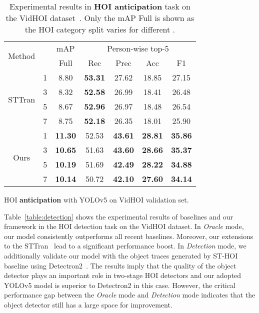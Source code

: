\documentclass[times,twocolumn,final,authoryear]{elsarticle}
\begin{document}
\begin{table}
    \begin{subtable}[]{0.47\textwidth}
        \centering
        \small
        \begin{tabular}{|c|c|c|c c c c|}
            \hline
            \multirow{2}{*}{Method} & \multirow{2}{*}{} & mAP & \multicolumn{4}{c|}{Person-wise top-5} \\
            \cline{3-7}
            & & Full & Rec & Prec & Acc & F1 \\
            \hline
            \multirow{4}{*}{STTran} & 1 & 8.80 & \textbf{53.31} & 27.62 & 18.85 & 27.15\\
            & 3 & 8.32 & \textbf{52.58} & 26.99 & 18.41 & 26.48\\
            & 5 & 8.67 & \textbf{52.96} & 26.97 & 18.48 & 26.54\\
            & 7 & 8.75 & \textbf{52.18} & 26.35 & 18.01 & 25.90\\
            \hline
            \multirow{4}{*}{Ours} & 1 & \textbf{11.30} & 52.53 & \textbf{43.61} & \textbf{28.81} & \textbf{35.86}\\
            & 3 & \textbf{10.65} & 51.63 & \textbf{43.60} & \textbf{28.66} & \textbf{35.37}\\
            & 5 & \textbf{10.19} & 51.69 & \textbf{42.49} & \textbf{28.22} & \textbf{34.88}\\
            & 7 & \textbf{10.14} & 50.72 & \textbf{42.10} & \textbf{27.60} & \textbf{34.14}\\
            \hline
        \end{tabular}
        \caption{HOI \textbf{anticipation} with YOLOv5 on VidHOI validation set.}
        \label{table:anticipation_det}
    \end{subtable}

    \caption{Experimental results in \textbf{HOI anticipation} task on the VidHOI dataset~\citep{hoi_v_set:VidHOI}. Only the mAP Full is shown as the HOI category split varies for different . }
    \label{table:anticipation}
\end{table}

Table~\ref{table:detection} shows the experimental results of baselines and our framework in the HOI detection task on the VidHOI dataset. In \emph{Oracle} mode, our model consistently outperforms all recent baselines. Moreover, our extensions to the STTran~\citep{hoi_v2:sttran} lead to a significant performance boost. In \emph{Detection} mode, we additionally validate our model with the object traces generated by ST-HOI baseline using Detectron2~\citep{detection:detectron2}. The results imply that the quality of the object detector plays an important role in two-stage HOI detectors and our adopted YOLOv5 model is superior to Detectron2 in this case. However, the critical performance gap between the \textit{Oracle} mode and \textit{Detection} mode indicates that the object detector still has a large space for improvement.
\end{document}
